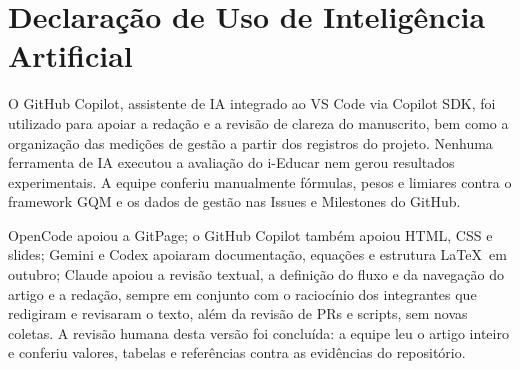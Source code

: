 \documentclass[conference]{model/IEEEtran}%
\begin{document}
\section*{Declaração de Uso de Inteligência Artificial}
\label{sec:ia}
O GitHub Copilot, assistente de IA integrado ao VS Code via Copilot SDK, foi utilizado para apoiar a redação e a revisão de clareza do manuscrito, bem como a organização das medições de gestão a partir dos registros do projeto. Nenhuma ferramenta de IA executou a avaliação do i-Educar nem gerou resultados experimentais. A equipe conferiu manualmente fórmulas, pesos e limiares contra o framework GQM e os dados de gestão nas Issues e Milestones do GitHub.

OpenCode apoiou a GitPage; o GitHub Copilot também apoiou HTML, CSS e slides; Gemini e Codex apoiaram documentação, equações e estrutura \LaTeX\ em outubro; Claude apoiou a revisão textual, a definição do fluxo e da navegação do artigo e a redação, sempre em conjunto com o raciocínio dos integrantes que redigiram e revisaram o texto, além da revisão de PRs e scripts, sem novas coletas. A revisão humana desta versão foi concluída: a equipe leu o artigo inteiro e conferiu valores, tabelas e referências contra as evidências do repositório.
\end{document}
